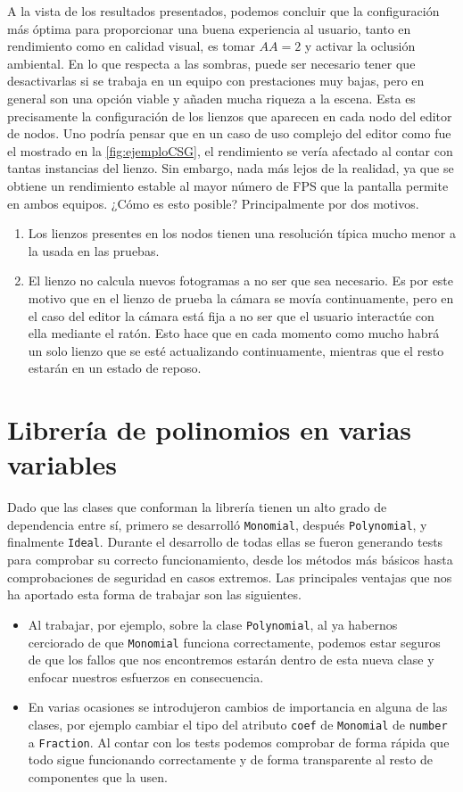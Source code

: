 A la vista de los resultados presentados, podemos concluir que la configuración más óptima para proporcionar una buena experiencia al usuario, tanto en rendimiento como en calidad visual, es tomar $AA=2$ y activar la oclusión ambiental. En lo que respecta a las sombras, puede ser necesario tener que desactivarlas si se trabaja en un equipo con prestaciones muy bajas, pero en general son una opción viable y añaden mucha riqueza a la escena. Esta es precisamente la configuración de los lienzos que aparecen en cada nodo del editor de nodos. Uno podría pensar que en un caso de uso complejo del editor como fue el mostrado en la \autoref{fig:ejemploCSG}, el rendimiento se vería afectado al contar con tantas instancias del lienzo. Sin embargo, nada más lejos de la realidad, ya que se obtiene un rendimiento estable al mayor número de FPS que la pantalla permite en ambos equipos. ¿Cómo es esto posible? Principalmente por dos motivos.
\begin{enumerate}
    \item Los lienzos presentes en los nodos tienen una resolución típica mucho menor a la usada en las pruebas.
    \item El lienzo no calcula nuevos fotogramas a no ser que sea necesario. Es por este motivo que en el lienzo de prueba la cámara se movía continuamente, pero en el caso del editor la cámara está fija a no ser que el usuario interactúe con ella mediante el ratón. Esto hace que en cada momento como mucho habrá un solo lienzo que se esté actualizando continuamente, mientras que el resto estarán en un estado de reposo.
\end{enumerate}

\section{Librería de polinomios en varias variables}\label{sec:libreria}
Dado que las clases que conforman la librería tienen un alto grado de dependencia entre sí, primero se desarrolló \texttt{Monomial}, después \texttt{Polynomial}, y finalmente \texttt{Ideal}. Durante el desarrollo de todas ellas se fueron generando tests para comprobar su correcto funcionamiento, desde los métodos más básicos hasta comprobaciones de seguridad en casos extremos. Las principales ventajas que nos ha aportado esta forma de trabajar son las siguientes.
\begin{itemize}
    \item Al trabajar, por ejemplo, sobre la clase \texttt{Polynomial}, al ya habernos cerciorado de que \texttt{Monomial} funciona correctamente, podemos estar seguros de que los fallos que nos encontremos estarán dentro de esta nueva clase y enfocar nuestros esfuerzos en consecuencia.
    \item En varias ocasiones se introdujeron cambios de importancia en alguna de las clases, por ejemplo cambiar el tipo del atributo \texttt{coef} de \texttt{Monomial} de \texttt{number} a \texttt{Fraction}. Al contar con los tests podemos comprobar de forma rápida que todo sigue funcionando correctamente y de forma transparente al resto de componentes que la usen.
\end{itemize}

